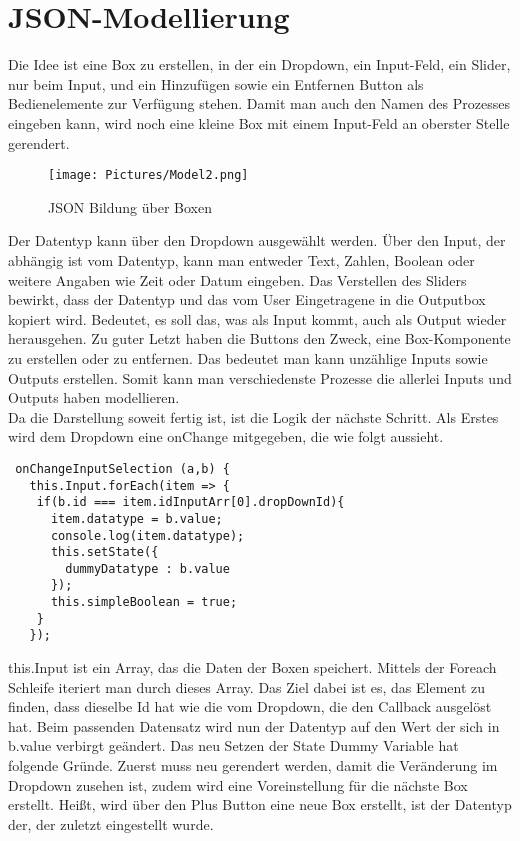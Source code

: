 \documentclass[a4paper,11pt]{scrreprt}
\begin{document}
\section{JSON-Modellierung}
Die Idee ist eine Box zu erstellen, in der ein Dropdown, ein Input-Feld, ein Slider, nur beim Input, und ein Hinzufügen sowie ein Entfernen Button als Bedienelemente zur Verfügung stehen. Damit man auch den Namen des Prozesses eingeben kann, wird noch eine kleine Box mit einem Input-Feld an oberster Stelle gerendert. 
\begin{figure}[ht]
\centering
\texttt{[image: Pictures/Model2.png]}
\caption{JSON Bildung über Boxen}
\label{JSON Bildung über Boxen}
\end{figure}
\hfill \break
Der Datentyp kann über den Dropdown ausgewählt werden. Über den Input, der abhängig ist vom Datentyp, kann man entweder Text, Zahlen, Boolean oder weitere Angaben wie Zeit oder Datum eingeben. Das Verstellen des Sliders bewirkt, dass der Datentyp und das vom User Eingetragene in die Outputbox kopiert wird. Bedeutet, es soll das, was als Input kommt, auch als Output wieder herausgehen. Zu guter Letzt haben die Buttons den Zweck,  eine Box-Komponente zu erstellen oder zu entfernen. Das bedeutet man kann unzählige Inputs sowie Outputs erstellen. Somit kann man verschiedenste Prozesse die allerlei Inputs und Outputs haben modellieren.
\\
Da die Darstellung soweit fertig ist, ist die Logik der nächste Schritt. Als Erstes wird dem Dropdown eine onChange mitgegeben, die wie folgt aussieht. 
\begin{lstlisting}
 onChangeInputSelection (a,b) {
   this.Input.forEach(item => {
    if(b.id === item.idInputArr[0].dropDownId){
      item.datatype = b.value;
      console.log(item.datatype);
      this.setState({
        dummyDatatype : b.value
      });
      this.simpleBoolean = true;
    }
   });
\end{lstlisting}
this.Input ist ein Array, das die Daten der Boxen speichert. Mittels der Foreach Schleife iteriert man durch dieses Array. Das Ziel dabei ist es, das Element zu finden, dass dieselbe Id hat wie die vom Dropdown, die den Callback ausgelöst hat. Beim passenden Datensatz wird nun der Datentyp auf den Wert der sich in b.value verbirgt geändert. Das neu Setzen der State Dummy Variable hat folgende Gründe. Zuerst muss neu gerendert werden, damit die Veränderung im Dropdown zusehen ist, zudem wird eine Voreinstellung für die nächste Box erstellt. Heißt, wird über den Plus Button eine neue Box erstellt, ist der Datentyp der, der zuletzt eingestellt wurde.
\end{document}
